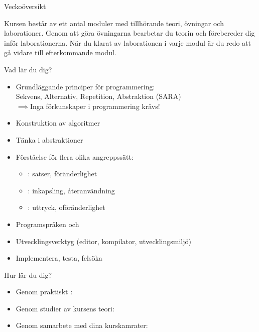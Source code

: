 


\begin{Slide}{Veckoöversikt}
\noindent\resizebox{0.9\columnwidth}{!}{

}
\end{Slide}

\ifkompendium
\noindent Kursen består av ett antal moduler med tillhörande teori, övningar och laborationer. Genom att göra övningarna bearbetar du teorin och förebereder dig inför laborationerna. När du klarat av  laborationen i varje modul är du redo att gå vidare till efterkommande modul.  
\fi

\begin{Slide}{Vad lär du dig?}
\begin{itemize}
\item Grundläggande principer för programmering:\\ Sekvens, Alternativ, Repetition, Abstraktion (SARA)\\$\implies$Inga förkunskaper i programmering krävs!
\item Konstruktion av algoritmer
\item Tänka i abstraktioner
\item Förståelse för flera olika angreppssätt: 
\begin{itemize}
\item {}: satser, föränderlighet
\item {}: inkapsling, återanvändning
\item {}: uttryck, oföränderlighet
\end{itemize}
\item Programspråken  och 
\item Utvecklingsverktyg (editor, kompilator, utvecklingsmiljö)
\item Implementera, testa, felsöka
\end{itemize}
\end{Slide}

\begin{Slide}{Hur lär du dig?}
\begin{itemize}
\item Genom praktiskt : 
\item Genom studier av kursens teori: 
\item Genom samarbete med dina kurskamrater: 
\end{itemize}
\end{Slide}


